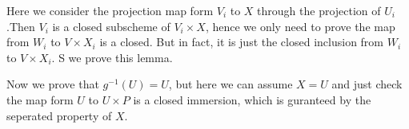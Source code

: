 \documentclass[10pt,letterpaper]{article}
\theoremstyle{plain}
\theoremstyle{definition}
\theoremstyle{remark}
\begin{document}
\begin{itemize}
\begin{itemize}
Here we consider the projection map form $V_{i}$ to $X$ through the projection of $U_{i}$.Then $V_{i}$ is a closed subscheme of $V_{i}\times X$, hence we only need to prove the map from $W_{i}$ to $V\times X_{i}$ is a closed. But in fact, it is just the closed inclusion from $W_{i}$ to $V \times X_{i}$. S we prove this lemma.


Now we prove that $g^{-1}(U)=U$, but here we can assume $X=U$ and just check the map form $U$ to $U\times P$ is a closed immersion, which is guranteed by the seperated property of $X$.



   \end{itemize}
\end{itemize}
\end{document}
